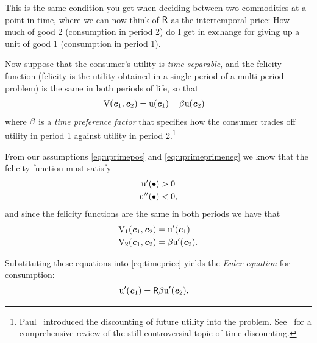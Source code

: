 \documentclass{scrartcl}
\begin{document}
  This is the same condition you get when deciding between two commodities at a point in time, where we can now think of $\mathsf{R}$ as the intertemporal price: How much of good 2 (consumption in period 2) do I get in exchange for giving up a unit of good 1 (consumption in period 1).

  Now suppose that the consumer's utility is \textit{time-separable}, and the felicity function (felicity is the utility obtained in a single period of a multi-period problem) is the same in both periods of life, so that
  \begin{equation}\begin{gathered}\begin{aligned} \mathrm{V}(\boldsymbol{\mathit{c}}_{1},\boldsymbol{\mathit{c}}_{2}) & = \mathrm{u}(\boldsymbol{\mathit{c}}_{1})+\beta \mathrm{u}(\boldsymbol{\mathit{c}}_{2})
      \end{aligned}\end{gathered}\end{equation} where $\beta$ is a \textit{time preference factor} that specifies how the consumer trades off utility in period 1 against utility in period 2.\footnote{Paul~\cite{samuelson1937note,samuelsonOLG} introduced the discounting of future utility into the problem.  See~\cite{floDiscFacing} for a comprehensive review of the still-controversial topic of time discounting.}

  From our assumptions \eqref{eq:uprimepos} and \eqref{eq:uprimeprimeneg} we know that the felicity function must satisfy
  \begin{equation}\begin{gathered}\begin{aligned} \mathrm{u}^{\prime}(\bullet) & > 0 \\ \mathrm{u}^{\prime\prime}(\bullet) & < 0,
      \end{aligned}\end{gathered}\end{equation} and since the felicity functions are the same in both periods we have that
  \begin{equation}\begin{gathered}\begin{aligned} \mathrm{V}_{1}(\boldsymbol{\mathit{c}}_{1},\boldsymbol{\mathit{c}}_{2}) & = \mathrm{u}^{\prime}(\boldsymbol{\mathit{c}}_{1}) \\ \mathrm{V}_{2}(\boldsymbol{\mathit{c}}_{1},\boldsymbol{\mathit{c}}_{2}) & = \beta \mathrm{u}^{\prime}(\boldsymbol{\mathit{c}}_{2}).
      \end{aligned}\end{gathered}\end{equation}

  Substituting these equations into \eqref{eq:timeprice} yields the \textit{Euler equation} for consumption:
  \begin{equation}\begin{gathered}\begin{aligned} \mathrm{u}^{\prime}(\boldsymbol{\mathit{c}}_{1}) & = \mathsf{R} \beta \mathrm{u}^{\prime}(\boldsymbol{\mathit{c}}_{2}). \label{eq:euler}
      \end{aligned}\end{gathered}\end{equation}
\end{document}
